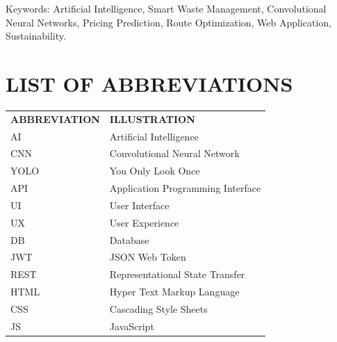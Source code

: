 \noindent Keywords: Artificial Intelligence, Smart Waste Management, Convolutional Neural Networks, Pricing Prediction, Route Optimization, Web Application, Sustainability.

\newpage
\clearpage
\tableofcontents
\thispagestyle{empty}

\newpage
\listoffigures
{}
\thispagestyle{empty}

\newpage
\listoftables
{}
\thispagestyle{empty}

\newpage
\chapter*{LIST OF ABBREVIATIONS}
\setcounter{page}{1}
\begin{center}
\renewcommand{\arraystretch}{1.5}
\begin{tabular}{p{4cm} p{8cm}}
\textbf{ABBREVIATION} & \textbf{ILLUSTRATION} \\[0.5cm]
AI & Artificial Intelligence \\
CNN & Convolutional Neural Network \\
YOLO & You Only Look Once \\
API & Application Programming Interface \\
UI & User Interface \\
UX & User Experience \\
DB & Database \\
JWT & JSON Web Token \\
REST & Representational State Transfer \\
HTML & Hyper Text Markup Language \\
CSS & Cascading Style Sheets \\
JS & JavaScript \\
\end{tabular}
\end{center}
\clearpage
